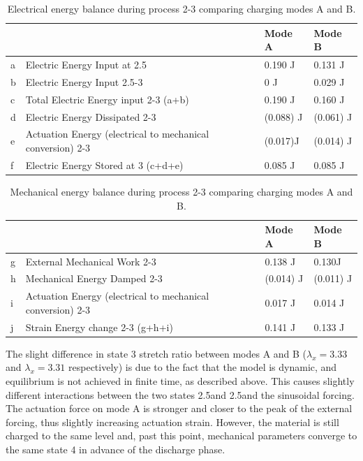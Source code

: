 \begin{table}[htb]
\caption{Electrical energy balance during process 2-3 comparing charging modes A and B.} 
\label{tab:1}
\begin{center}       
\begin{tabular}{|l|l|l|l|}
\hline
\rule[-1ex]{0pt}{3.5ex}   & & Mode A & Mode B  \\
\hline
\rule[-1ex]{0pt}{3.5ex}  a & Electric Energy Input at 2.5 & 0.190 J	& 0.131 J\\
\hline
\rule[-1ex]{0pt}{3.5ex}  b & Electric Energy Input 2.5-3 &0 J & 0.029 J\\
\hline
\rule[-1ex]{0pt}{3.5ex}  c & Total Electric Energy input 2-3 (a+b)	&0.190 J&	0.160 J \\
\hline
\rule[-1ex]{0pt}{3.5ex}  d & Electric Energy Dissipated 2-3 &	(0.088) J&	(0.061) J\\
\hline 
\rule[-1ex]{0pt}{3.5ex}  e&	Actuation Energy (electrical to mechanical conversion) 2-3&	(0.017)J &(0.014) J\\
\hline 
\rule[-1ex]{0pt}{3.5ex}  f& Electric Energy Stored at 3 (c+d+e)	&0.085 J	&0.085 J\\
\hline 
\end{tabular}
\end{center}
\end{table}

		
\begin{table}[htb]
\caption{Mechanical energy balance during process  2-3 comparing charging modes A and B.} 
\label{tab:2}
\begin{center}       
\begin{tabular}{|l|l|l|l|}
\hline
\rule[-1ex]{0pt}{3.5ex}   & & Mode A & Mode B  \\
\hline
\rule[-1ex]{0pt}{3.5ex}  g&	External Mechanical Work 2-3	&0.138 J	&0.130J\\
\hline
\rule[-1ex]{0pt}{3.5ex}  h & Mechanical Energy Damped 2-3	&(0.014) J	&(0.011) J\\
\hline
\rule[-1ex]{0pt}{3.5ex}  i & Actuation Energy (electrical to mechanical conversion) 2-3	&0.017 J&	0.014 J \\
\hline
\rule[-1ex]{0pt}{3.5ex}  j & Strain Energy change 2-3 (g+h+i)	&0.141 J	&0.133 J\\
\hline 

\end{tabular}
\end{center}
\end{table}

The slight difference in state 3 stretch ratio between modes A and B ($\lambda_x=3.33$ and $\lambda_x=3.31$ respectively) is due to the fact that the model is dynamic, and equilibrium is not achieved in finite time, as described above. This causes slightly different interactions between the two states 2.5\textquotesingle and 2.5\textquotedbl and the sinusoidal forcing. The actuation force on mode A is stronger and closer to the peak of the external forcing, thus slightly increasing actuation strain. However, the material is still charged to the same level and, past this point, mechanical parameters converge to the same state 4 in advance of the discharge phase. 

